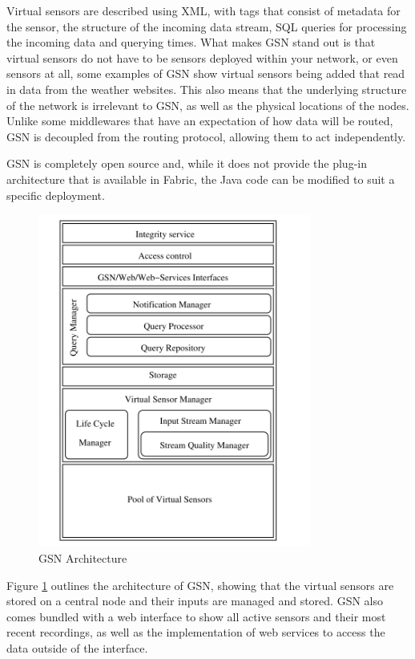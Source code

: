 Virtual sensors are described using XML, with tags that consist of metadata for the sensor, the structure of the incoming data stream, SQL queries for processing the incoming data and querying times. What makes GSN stand out is that virtual sensors do not have to be sensors deployed within your network, or even sensors at all, some examples of GSN show virtual sensors being added that read in data from the weather websites. This also means that the underlying structure of the network is irrelevant to GSN, as well as the physical locations of the nodes. Unlike some middlewares that have an expectation of how data will be routed, GSN is decoupled from the routing protocol, allowing them to act independently.

GSN is completely open source and, while it does not provide the plug-in architecture that is available in Fabric, the Java code can be modified to suit a specific deployment. 

		\begin{figure}[p]
		\centering
		\includegraphics[width=0.8\textwidth]{Chap2/figures/gsn_arch.png}
		\caption{GSN Architecture}
		\label{bg:fig:gsn}
		\end{figure}

Figure \ref{bg:fig:gsn} outlines the architecture of GSN, showing that the virtual sensors are stored on a central node and their inputs are managed and stored. GSN also comes bundled with a web interface to show all active sensors and their most recent recordings, as well as the implementation of web services to access the data outside of the interface.

